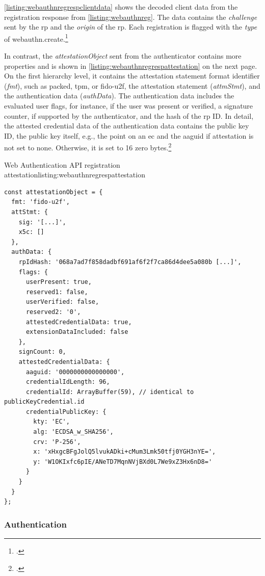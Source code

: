 \autoref{listing:webauthnregrespclientdata} shows the decoded client data from the \wa{} registration response from \autoref{listing:webauthnreg}. The data contains the \textit{challenge} sent by the \gls{rp} and the \textit{origin} of the \gls{rp}. Each registration is flagged with the \textit{type} of \frqq webauthn.create\flqq.\footcites[See][Chapter 5.10.1]{w3c}

In contrast, the \textit{attestationObject} sent from the authenticator contains more properties and is shown in \autoref{listing:webauthnregrespattestation} on the next page. On the first hierarchy level, it contains the attestation statement format identifier (\textit{fmt}), such as \frqq packed, tpm, or fido-u2f\flqq, the attestation statement (\textit{attmStmt}), and the authentication data (\textit{authData}). The authentication data includes the evaluated user flags, for instance, if the user was present or verified, a signature counter, if supported by the authenticator, and the hash of the \gls{rp} ID. In detail, the attested credential data of the authentication data contains the public key ID, the public key itself, e.g., the point on an \gls{ec} and the \gls{aaguid} if attestation is not set to none. Otherwise, it is set to 16 zero bytes.\footcites[See][Chapter 5.1.3, 6.1]{w3c}

\begin{example}{Web Authentication API registration attestation}{listing:webauthnregrespattestation}
\begin{verbatim}
const attestationObject = {
  fmt: 'fido-u2f',
  attStmt: {
    sig: '[...]',
    x5c: []
  },
  authData: {
    rpIdHash: '068a7ad7f858dadbf691af6f2f7ca86d4dee5a080b [...]',
    flags: {
      userPresent: true,
      reserved1: false,
      userVerified: false,
      reserved2: '0',
      attestedCredentialData: true,
      extensionDataIncluded: false
    },
    signCount: 0,
    attestedCredentialData: {
      aaguid: '0000000000000000',
      credentialIdLength: 96,
      credentialId: ArrayBuffer(59), // identical to publicKeyCredential.id
      credentialPublicKey: {
        kty: 'EC',
        alg: 'ECDSA_w_SHA256',
        crv: 'P-256',
        x: 'xHxgcBFgJolQ5lvukADki+cMum3Lmk50tfj0YGH3nYE=',
        y: 'W1OKIxfc6pIE/ANeTD7MqnNVjBXd0L7We9xZ3Hx6nD8='
      }
    }
  }
};
\end{verbatim}
\end{example}

\subsubsection{Authentication}

